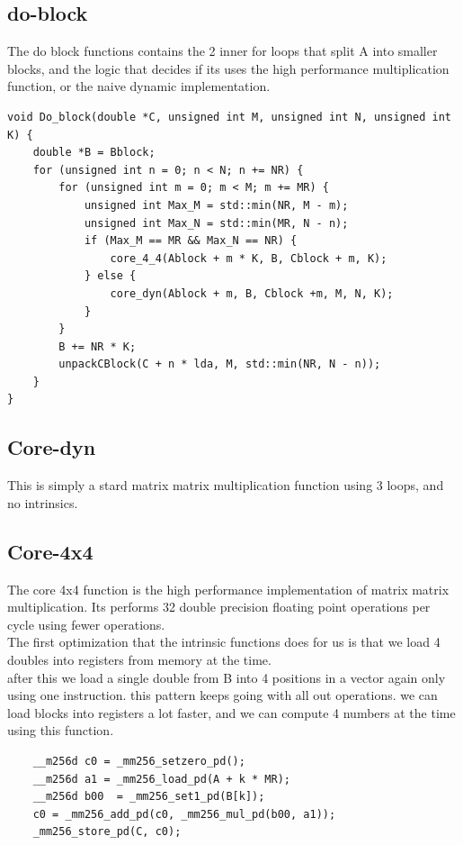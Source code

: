 \documentclass[a4paper,10pt,titlepage]{report}
\begin{document}
\subsection{do-block}
The do block functions contains the 2 inner for loops that split A into smaller blocks, and the logic that decides if its uses the high performance multiplication function, or the naive dynamic implementation. \\
\begin{lstlisting}
void Do_block(double *C, unsigned int M, unsigned int N, unsigned int K) {
    double *B = Bblock;
    for (unsigned int n = 0; n < N; n += NR) {
        for (unsigned int m = 0; m < M; m += MR) {
            unsigned int Max_M = std::min(NR, M - m);
            unsigned int Max_N = std::min(MR, N - n);
            if (Max_M == MR && Max_N == NR) {
                core_4_4(Ablock + m * K, B, Cblock + m, K);
            } else {
                core_dyn(Ablock + m, B, Cblock +m, M, N, K);
            }
        }
        B += NR * K;
        unpackCBlock(C + n * lda, M, std::min(NR, N - n));
    }
}
\end{lstlisting}

\subsection{Core-dyn}
This is simply a stard matrix matrix multiplication function using 3 loops, and no intrinsics.

\subsection{Core-4x4}
The core 4x4 function is the high performance implementation of matrix matrix multiplication. Its performs 32 double precision floating point operations per cycle using fewer operations. \\
The first optimization that the intrinsic functions does for us is that we load 4 doubles into registers from memory at the time. \\ after this we load a single double from B into 4 positions in a vector again only using one instruction. this pattern keeps going with all out operations. we can load blocks into registers a lot faster, and we can compute 4 numbers at the time using this function.

\begin{lstlisting}
    __m256d c0 = _mm256_setzero_pd();
    __m256d a1 = _mm256_load_pd(A + k * MR);
    __m256d b00  = _mm256_set1_pd(B[k]);
    c0 = _mm256_add_pd(c0, _mm256_mul_pd(b00, a1));
    _mm256_store_pd(C, c0);
\end{lstlisting}
\end{document}
